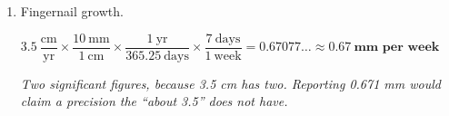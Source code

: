 \documentclass[12pt, twoside]{article}
\begin{document}
\begin{enumerate}[itemsep=0.25cm]
\begin{enumerate}[itemsep=0.15cm]
      \emph{Exactly 73.8, with no rounding needed: multiplying by 3.6 happens to land
      on three figures.}
  \end{enumerate}

\item Fingernail growth.

  $3.5~\dfrac{\text{cm}}{\text{yr}} \times \dfrac{10~\text{mm}}{1~\text{cm}}
  \times \dfrac{1~\text{yr}}{365.25~\text{days}} \times \dfrac{7~\text{days}}{1~\text{week}}
  = 0.67077\ldots \approx \mathbf{0.67~\textbf{mm per week}}$

  \emph{Two significant figures, because 3.5 cm has two. Reporting 0.671 mm would claim
  a precision the ``about 3.5'' does not have.}

\end{enumerate}
\end{document}

